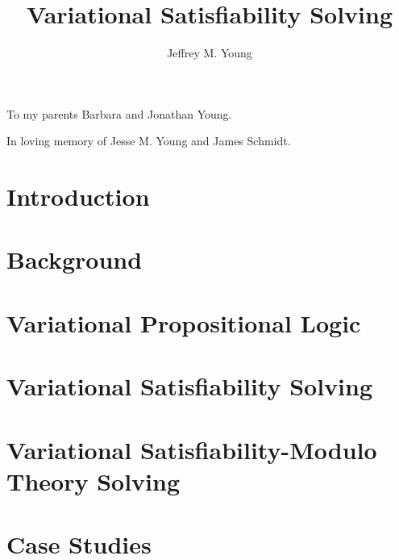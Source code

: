 \documentclass[preprint]{beavtex}
\title{Variational Satisfiability Solving}
\author{Jeffrey M. Young}
\begin{document}
\maketitle

\mainmatter{}

\listoftodos{}

\begin{dedication*}
  To my parents Barbara and Jonathan Young.

  In loving memory of Jesse M. Young and James Schmidt.
\end{dedication*}

\chapter{Introduction}


\chapter{Background}


\chapter{Variational Propositional Logic}


\chapter{Variational Satisfiability Solving}


\chapter{Variational Satisfiability-Modulo Theory Solving}


\chapter{Case Studies}

\end{document}
